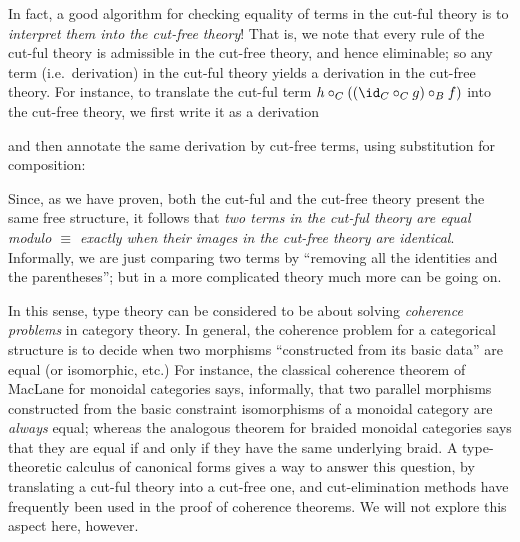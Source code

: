 In fact, a good algorithm for checking equality of terms in the cut-ful theory is to \emph{interpret them into the cut-free theory}!
That is, we note that every rule of the cut-ful theory is admissible in the cut-free theory, and hence eliminable; so any term (i.e.\ derivation) in the cut-ful theory yields a derivation in the cut-free theory.
For instance, to translate the cut-ful term $h\comp{C} ((\id_C\comp{C} g) \comp{B} f)$ into the cut-free theory, we first write it as a derivation
\begin{mathpar}
\end{mathpar}
and then annotate the same derivation by cut-free terms, using substitution for composition:
\begin{mathpar}
\end{mathpar}
Since, as we have proven, both the cut-ful and the cut-free theory present the same free structure, it follows that \emph{two terms in the cut-ful theory are equal modulo $\equiv$ exactly when their images in the cut-free theory are identical}.
Informally, we are just comparing two terms by  ``removing all the identities and the parentheses''; but in a more complicated theory much more can be going on.

In this sense, type theory can be considered to be about solving \emph{coherence problems} in category theory.
In general, the coherence problem for a categorical structure is to decide when two morphisms ``constructed from its basic data'' are equal (or isomorphic, etc.)
For instance, the classical coherence theorem of MacLane for monoidal categories says, informally, that two parallel morphisms constructed from the basic constraint isomorphisms of a monoidal category are \emph{always} equal; whereas the analogous theorem for braided monoidal categories says that they are equal if and only if they have the same underlying braid.
A type-theoretic calculus of canonical forms gives a way to answer this question, by translating a cut-ful theory into a cut-free one, and cut-elimination methods have frequently been used in the proof of coherence theorems. %
We will not explore this aspect here, however.

